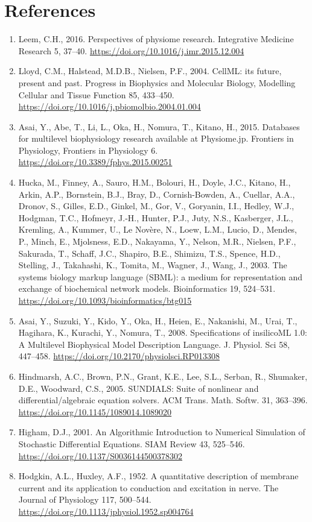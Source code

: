 \documentclass[a4paper,10pt]{report}
\begin{document}
\chapter{References}
\label{sec:orgb4b7c9b}

\begin{enumerate}
\item \label{orgc174cc7} Leem, C.H., 2016. Perspectives of physiome research. Integrative Medicine Research 5, 37–40. \url{https://doi.org/10.1016/j.imr.2015.12.004}
\item \label{orgf84e7f6} Lloyd, C.M., Halstead, M.D.B., Nielsen, P.F., 2004. CellML: its future, present and past. Progress in Biophysics and Molecular Biology, Modelling Cellular and Tissue Function 85, 433–450. \url{https://doi.org/10.1016/j.pbiomolbio.2004.01.004}
\item \label{org18aa28a} Asai, Y., Abe, T., Li, L., Oka, H., Nomura, T., Kitano, H., 2015. Databases for multilevel biophysiology research available at Physiome.jp. Frontiers in Physiology, Frontiers in Physiology 6. \url{https://doi.org/10.3389/fphys.2015.00251}
\item \label{org43e6e3b} Hucka, M., Finney, A., Sauro, H.M., Bolouri, H., Doyle, J.C., Kitano, H., Arkin, A.P., Bornstein, B.J., Bray, D., Cornish-Bowden, A., Cuellar, A.A., Dronov, S., Gilles, E.D., Ginkel, M., Gor, V., Goryanin, I.I., Hedley, W.J., Hodgman, T.C., Hofmeyr, J.-H., Hunter, P.J., Juty, N.S., Kasberger, J.L., Kremling, A., Kummer, U., Le Novère, N., Loew, L.M., Lucio, D., Mendes, P., Minch, E., Mjolsness, E.D., Nakayama, Y., Nelson, M.R., Nielsen, P.F., Sakurada, T., Schaff, J.C., Shapiro, B.E., Shimizu, T.S., Spence, H.D., Stelling, J., Takahashi, K., Tomita, M., Wagner, J., Wang, J., 2003. The systems biology markup language (SBML): a medium for representation and exchange of biochemical network models. Bioinformatics 19, 524–531. \url{https://doi.org/10.1093/bioinformatics/btg015}
\item \label{orgba0a56e} Asai, Y., Suzuki, Y., Kido, Y., Oka, H., Heien, E., Nakanishi, M., Urai, T., Hagihara, K., Kurachi, Y., Nomura, T., 2008. Specifications of insilicoML 1.0: A Multilevel Biophysical Model Description Language. J. Physiol. Sci 58, 447–458. \url{https://doi.org/10.2170/physiolsci.RP013308}
\item \label{orgc826483} Hindmarsh, A.C., Brown, P.N., Grant, K.E., Lee, S.L., Serban, R., Shumaker, D.E., Woodward, C.S., 2005. SUNDIALS: Suite of nonlinear and differential/algebraic equation solvers. ACM Trans. Math. Softw. 31, 363–396. \url{https://doi.org/10.1145/1089014.1089020}
\item \label{orgddca7ad} Higham, D.J., 2001. An Algorithmic Introduction to Numerical Simulation of Stochastic Differential Equations. SIAM Review 43, 525–546. \url{https://doi.org/10.1137/S0036144500378302}
\item \label{orgad39c98} Hodgkin, A.L., Huxley, A.F., 1952. A quantitative description of membrane current and its application to conduction and excitation in nerve. The Journal of Physiology 117, 500–544. \url{https://doi.org/10.1113/jphysiol.1952.sp004764}
\end{enumerate}
\end{document}
